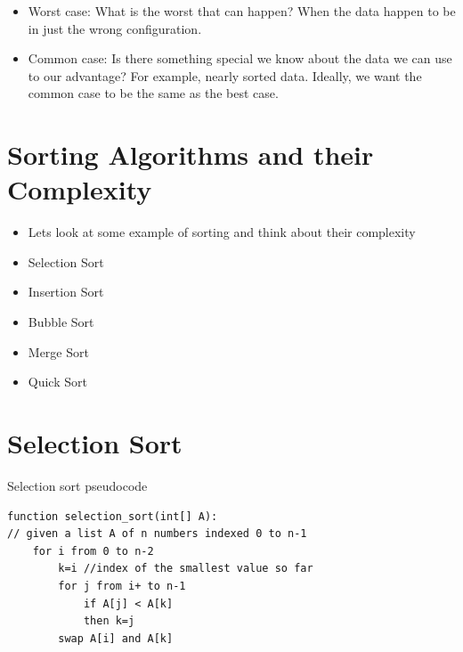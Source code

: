 \documentclass{beamer}
\begin{document}
\begin{frame} 
\begin{itemize}
\item Worst case: What is the worst that can happen? When the data happen to be in just the wrong configuration.
\item Common case: Is there something special we know about the data we can use to our advantage? For example, nearly
sorted data. Ideally, we want the common case to be the same as the best case.
\end{itemize}
\end{frame} 

\section{Sorting Algorithms and their Complexity}
\begin{frame}
\begin{itemize}
\item Lets look at some example of sorting and think about their complexity
\bigskip
\item Selection Sort
\item Insertion Sort 
\item Bubble Sort 
\item Merge Sort 
\item Quick Sort
\end{itemize}

\end{frame} 

\section{Selection Sort}
\begin{frame}[fragile]

Selection sort pseudocode

\begin{block}{}
\begin{lstlisting}
function selection_sort(int[] A):
// given a list A of n numbers indexed 0 to n-1
    for i from 0 to n-2
        k=i //index of the smallest value so far
        for j from i+ to n-1
            if A[j] < A[k]
            then k=j
        swap A[i] and A[k]
\end{lstlisting}
\end{block}
\end{frame} 
\end{document}
